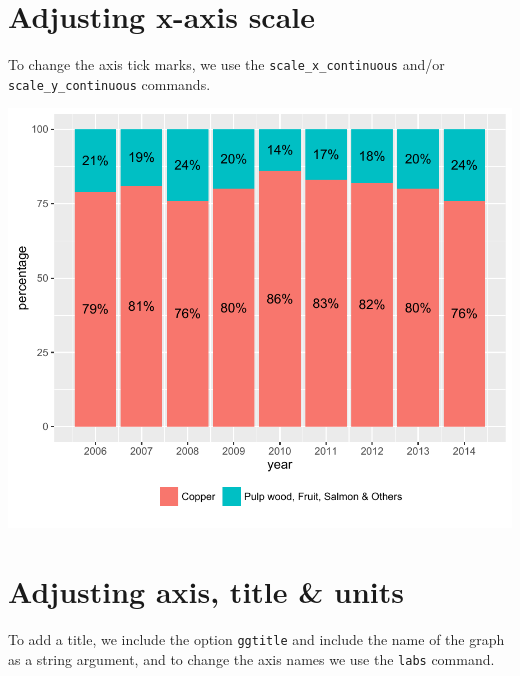 \section{Adjusting x-axis scale}\label{adjusting-x-axis-scale}

To change the axis tick marks, we use the \texttt{scale\_x\_continuous}
and/or \texttt{scale\_y\_continuous} commands.

\begin{Shaded}
\begin{Highlighting}[]
\StringTok{ }\StringTok{ }\NormalTok{(}\NormalTok{(}\NormalTok{,}\NormalTok{,}\NormalTok{))}
\end{Highlighting}
\end{Shaded}

\begin{center}\includegraphics[width=0.6\linewidth]{4_Stacked_Bar_pdf/stacked_6-1} \end{center}

\section{Adjusting axis, title \&
units}\label{adjusting-axis-title-units}

To add a title, we include the option \texttt{ggtitle} and include the
name of the graph as a string argument, and to change the axis names we
use the \texttt{labs} command.

\begin{Shaded}
\end{Shaded}

